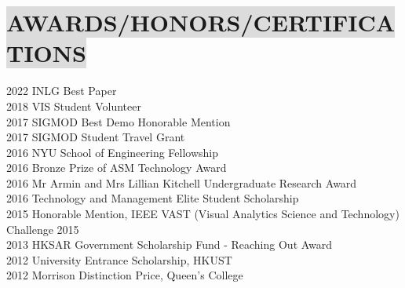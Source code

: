 \section*{
    \colorbox{gainsboro}{AWARDS/HONORS/CERTIFICATIONS}
}

2022 \hspace{9mm}
INLG Best Paper
\\
2018 \hspace{9mm} 
VIS Student Volunteer
\\
2017 \hspace{9mm} 
SIGMOD Best Demo Honorable Mention
\\
2017 \hspace{9mm} 
SIGMOD Student Travel Grant
\\
2016 \hspace{9mm} 
NYU School of Engineering Fellowship
\\
2016 \hspace{9mm} 
Bronze Prize of ASM Technology Award
\\
2016 \hspace{9mm} 
Mr Armin and Mrs Lillian Kitchell Undergraduate Research Award
\\
2016 \hspace{9mm} 
Technology and Management Elite Student Scholarship
\\
2015 \hspace{9mm} 
Honorable Mention, IEEE VAST (Visual Analytics Science and Technology) Challenge 2015
\\
2013 \hspace{9mm} 
HKSAR Government Scholarship Fund - Reaching Out Award
\\
2012 \hspace{9mm}
University Entrance Scholarship, HKUST
\\
2012 \hspace{9mm}
Morrison Distinction Price, Queen's College
